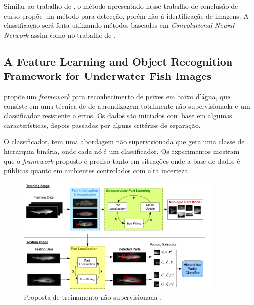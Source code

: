 Similar ao trabalho de , o método apresentado nesse trabalho de conclusão de curso propõe um método para detecção, porém não à identificação de imagens. A classificação será feita utilizando métodos baseados em \textit{Convolutional Neural Network} assim como no trabalho de .



\subsection{A Feature Learning and Object Recognition Framework for Underwater Fish Images}
 propõe um \textit{framework} para reconhecimento de peixes em baixo d'água, que consiste em uma técnica de de aprendizagem totalmente não supervisionada e um classificador resistente a erros. Os dados são iniciados com base em algumas características, depois passados por alguns critérios de separação. 

O classificador, tem uma abordagem não supervisionada que gera uma classe de hierarquia binária, onde cada nó é um classificador. Os experimentos mostram que o \textit{framework} proposto é preciso tanto em situações onde a base de dados é públicas quanto em ambientes controlados com alta incerteza.

\begin{figure}[h]
	\caption{\label{fig:trainingchuan}Proposta de treinamento não supervisionada .}
	\begin{center}
	    \includegraphics[width=0.9\textwidth]{resources/training}
	\end{center}
\end{figure}
   

